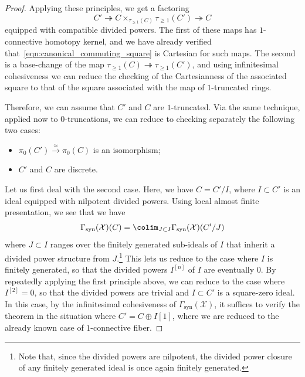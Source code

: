 \documentclass[10pt]{amsart}
\begin{document}
\begin{proof}
Applying these principles, we get a factoring 
\[
C'\twoheadrightarrow C\times_{\tau_{\ge 1}(C)}\tau_{\ge 1}(C')\twoheadrightarrow C
\] 
equipped with compatible divided powers. The first of these maps has $1$-connective homotopy kernel, and we have already verified that~\eqref{eqn:canonical_commuting_square} is Cartesian for such maps. The second is a base-change of the map $\tau_{\ge 1}(C)\twoheadrightarrow \tau_{\ge 1}(C')$, and using infinitesimal cohesiveness we can reduce the checking of the Cartesianness of the associated square to that of the square associated with the map of $1$-truncated rings. 

Therefore, we can assume that $C'$ and $C$ are $1$-truncated. Via the same technique, applied now to $0$-truncations, we can reduce to checking separately the following two cases:
\begin{itemize}
   \item $\pi_0(C')\xrightarrow{\simeq}\pi_0(C)$ is an isomorphism;
   \item $C'$ and $C$ are discrete.
\end{itemize}

Let us first deal with the second case. Here, we have $C = C'/I$, where $I\subset C'$ is an ideal equipped with nilpotent divided powers. Using local almost finite presentation, we see that we have 
\[
\Gamma_{\mathrm{syn}}(\mathcal{X})(C)= \colim_{J\subset I}\Gamma_{\mathrm{syn}}(\mathcal{X})(C'/J)
\]
where $J\subset I$ ranges over the finitely generated sub-ideals of $I$ that inherit a divided power structure from $J$.\footnote{Note that, since the divided powers are nilpotent, the divided power closure of any finitely generated ideal is once again finitely generated.} This lets us reduce to the case where $I$ is finitely generated, so that the divided powers $I^{[n]}$ of $I$ are eventually $0$.  By repeatedly applying the first principle above, we can reduce to the case where $I^{[2]} = 0$, so that the divided powers are trivial and $I\subset C'$ is a square-zero ideal. In this case, by the infinitesimal cohesiveness of $\Gamma_{\mathrm{syn}}(\mathcal{X})$, it suffices to verify the theorem in the situation where $C' = C\oplus I[1]$, where we are reduced to the already known case of $1$-connective fiber. 


\end{proof}
\end{document}
